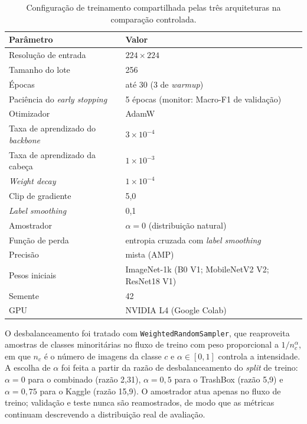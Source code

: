 \documentclass[11pt,a4paper]{article}
\begin{document}
	\begin{table}[htbp]
		\centering
		\small
		\caption{Configuração de treinamento compartilhada pelas três arquiteturas na comparação controlada.}
		\label{tab:hiper}
		\begin{tabular}{ll}
			\toprule
			\textbf{Parâmetro} & \textbf{Valor} \\
			\midrule
			Resolução de entrada & $224 \times 224$ \\
			Tamanho do lote & 256 \\
			Épocas & até 30 (3 de \emph{warmup}) \\
			Paciência do \emph{early stopping} & 5 épocas (monitor: Macro-F1 de validação) \\
			Otimizador & AdamW \\
			Taxa de aprendizado do \textit{backbone} & $3 \times 10^{-4}$ \\
			Taxa de aprendizado da cabeça & $1 \times 10^{-3}$ \\
			\textit{Weight decay} & $1 \times 10^{-4}$ \\
			Clip de gradiente & 5,0 \\
			\emph{Label smoothing} & 0,1 \\
			Amostrador & $\alpha = 0$ (distribuição natural) \\
			Função de perda & entropia cruzada com \emph{label smoothing} \\
			Precisão & mista (AMP) \\
			Pesos iniciais & ImageNet-1k (B0 V1; MobileNetV2 V2; ResNet18 V1) \\
			Semente & 42 \\
			GPU & NVIDIA L4 (Google Colab) \\
			\bottomrule
		\end{tabular}
	\end{table}
	
	O desbalanceamento foi tratado com \texttt{WeightedRandomSampler}, que reaproveita amostras de classes minoritárias no fluxo de treino com peso proporcional a $1/n_c^{\alpha}$, em que $n_c$ é o número de imagens da classe $c$ e $\alpha \in [0,1]$ controla a intensidade. A escolha de $\alpha$ foi feita a partir da razão de desbalanceamento do \emph{split} de treino: $\alpha = 0$ para o combinado (razão 2,31), $\alpha = 0{,}5$ para o TrashBox (razão 5,9) e $\alpha = 0{,}75$ para o Kaggle (razão 15,9). O amostrador atua apenas no fluxo de treino; validação e teste nunca são reamostrados, de modo que as métricas continuam descrevendo a distribuição real de avaliação.
	
\end{document}

